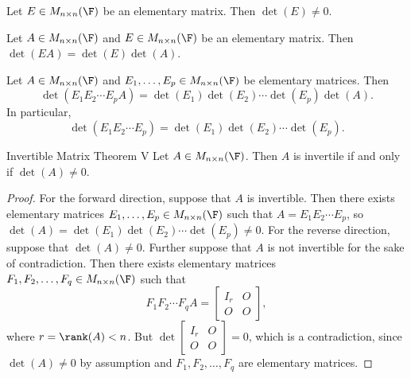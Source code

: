 \documentclass[linearalgebra]{subfiles}
\begin{document}
    \begin{cor}{}
        Let $E\in M_{n\times n}(\F)$ be an elementary matrix. Then $\det(E)\neq 0$.
    \end{cor}	

    \begin{cor}{}
        Let $A\in M_{n\times n}(\F)$ and $E\in M_{n\times n}(\F)$ be an elementary matrix. Then $\det \left( EA \right) = \det(E) \det(A)$.
    \end{cor}	

    \begin{cor}{}
        Let $A\in M_{n\times n}(\F)$ and $E_1, \ldots, E_p\in M_{n\times n}(\F)$ be elementary matrices. Then 
        \begin{equation*}
            \det \left( E_1E_2\cdots E_pA \right) = \det(E_1) \det(E_2) \cdots \det(E_p) \det(A).
        \end{equation*}
        In particular,
        \begin{equation*}
            \det \left( E_1E_2\cdots E_p \right) = \det(E_1) \det(E_2) \cdots \det(E_p).
        \end{equation*}
    \end{cor}	

    \begin{theorem}{Invertible Matrix Theorem V}
        Let $A\in M_{n\times n}(\F)$. Then $A$ is invertile if and only if $\det(A)\neq 0$.
    \end{theorem}

    \begin{proof}
        For the forward direction, suppose that $A$ is invertible. Then there exists elementary matrices $E_1, \ldots, E_p\in M_{n\times n}(\F)$ such that $A = E_1E_2\cdots E_p$, so $\det(A) = \det(E_1) \det(E_2) \cdots \det(E_p) \neq 0$. For the reverse direction, suppose that $\det(A)\neq 0$. Further suppose that $A$ is not invertible for the sake of contradiction. Then there exists elementary matrices $F_1, F_2, \ldots, F_q\in M_{n\times n}(\F)$ such that
        \begin{equation*}
            F_1F_2\cdots F_qA = 
            \begin{bmatrix}
                I_r & O \\ O & O
            \end{bmatrix},
        \end{equation*}
        where $r = \rank(A) < n$. But $\det \begin{bmatrix} I_r & O \\ O & O \end{bmatrix} = 0$, which is a contradiction, since $\det(A)\neq 0$ by assumption and $F_1, F_2, \ldots, F_q$ are elementary matrices.
    \end{proof}
\end{document}
